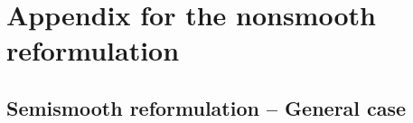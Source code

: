\documentclass[11pt]{article}
\begin{document}
%
%
%
%


\section{Appendix for the nonsmooth reformulation}

\subsection{Semismooth reformulation -- General case\label{app:nseq:gencase}}
\end{document}
